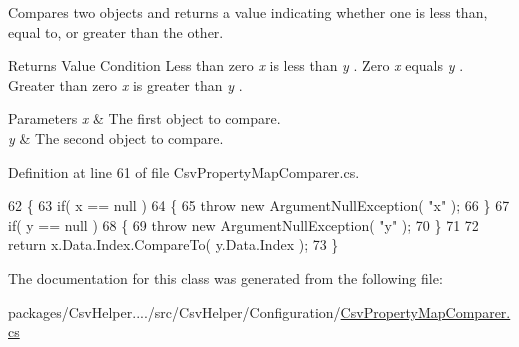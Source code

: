 Compares two objects and returns a value indicating whether one is less than, equal to, or greater than the other. 

\begin{DoxyReturn}{Returns}
Value Condition Less than zero {\itshape x}  is less than {\itshape y} . Zero {\itshape x}  equals {\itshape y} . Greater than zero {\itshape x}  is greater than {\itshape y} . 
\end{DoxyReturn}

\begin{DoxyParams}{Parameters}
{\em x} & The first object to compare. \\
\hline
{\em y} & The second object to compare. \\
\hline
\end{DoxyParams}


Definition at line 61 of file Csv\-Property\-Map\-Comparer.\-cs.


\begin{DoxyCode}
62         \{
63             \textcolor{keywordflow}{if}( x == null )
64             \{
65                 \textcolor{keywordflow}{throw} \textcolor{keyword}{new} ArgumentNullException( \textcolor{stringliteral}{"x"} );
66             \}
67             \textcolor{keywordflow}{if}( y == null )
68             \{
69                 \textcolor{keywordflow}{throw} \textcolor{keyword}{new} ArgumentNullException( \textcolor{stringliteral}{"y"} );
70             \}
71 
72             \textcolor{keywordflow}{return} x.Data.Index.CompareTo( y.Data.Index );
73         \}
\end{DoxyCode}


The documentation for this class was generated from the following file\-:\begin{DoxyCompactItemize}
\item 
packages/\-Csv\-Helper..../src/\-Csv\-Helper/\-Configuration/\hyperlink{a00202}{Csv\-Property\-Map\-Comparer.\-cs}\end{DoxyCompactItemize}
